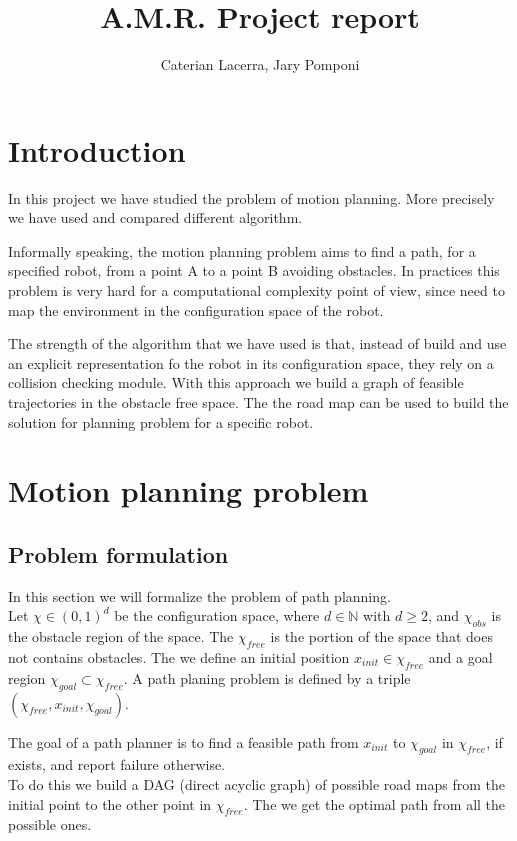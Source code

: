 \documentclass[10pt]{article}
\title{A.M.R. Project report}
\author{Caterian Lacerra, Jary Pomponi}
\begin{document}
	\maketitle
	\section{Introduction}
	In this project we have studied the problem of motion planning. More precisely we have used and compared different algorithm. 
	
	Informally speaking, the motion planning problem aims to find a path, for a specified robot, from a point A to a point B avoiding obstacles. In practices this problem is very hard for a computational complexity point of view, since need to map the environment in the configuration space of the robot. 
	
	The strength of the algorithm that we have used is that, instead of build and use an explicit representation fo the robot in its configuration space, they rely on a collision checking module. With this approach we build a graph of feasible trajectories in the obstacle free space. The the road map can be used to build the solution for planning problem for a specific robot.
	
	\section{Motion planning problem}
	\subsection{Problem formulation}
	In this section we will formalize the problem of path planning.\\
	
	Let $\chi \in(0,1)^d$ be the configuration space, where $d\in\mathbb{N}$ with $d\ge2$, and $\chi_{obs}$ is the obstacle region of the space. The $\chi_{free}$ is the portion of the space that does not contains obstacles.
	The we define an initial position $x_{init} \in \chi_{free}$ and a goal region $\chi_{goal} \subset \chi_{free}$. A path planing problem is defined by a triple $(\chi_{free},x_{init},\chi_{goal}) $. 
	
	The goal of a path planner is to find a feasible path from $x_{init}$ to $\chi_{goal}$ in $\chi_{free}$, if exists, and report failure otherwise.\\
	
	To do this we build a DAG (direct acyclic graph) of possible road maps from the initial point to the other point in $\chi_{free}$. The we get the optimal path from all the possible ones.
	
\end{document}

